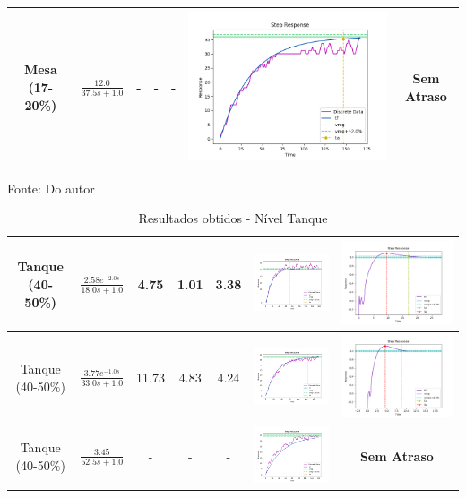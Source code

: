 \begin{table}[!htbp]
\begin{tabular}{|c|c|c|c|c|c|c|}
\hline
Mesa (17-20\%) & $\frac{12.0}{37.5s + 1.0}$ & - & - & - & \includegraphics[width=0.2\linewidth]{figuras/mesa_17_20} & \textbf{Sem Atraso} \\
\hline
\end{tabular}
\label{tab:results_mesa}
\vspace{0cm}\hspace{0cm}\small{Fonte: Do autor}
\end{table}

\begin{table}[!htbp]
\caption{Resultados obtidos - Nível Tanque}
\centering
\begin{tabular}{|c|c|c|c|c|c|c|}
\hline
Tanque (40-50\%) & $\frac{2.58 e^{-2.0s}}{18.0s + 1.0}$ & 4.75 & 1.01 & 3.38 & \includegraphics[width=0.2\linewidth]{figuras/tanque_40_50} & \includegraphics[width=0.2\linewidth]{figuras/tanque_40_50c} \\
\hline
Tanque (40-50\%) & $\frac{3.77 e^{-1.0s}}{33.0s + 1.0}$ & 11.73 & 4.83 & 4.24 & \includegraphics[width=0.2\linewidth]{figuras/tanque_50_60} & \includegraphics[width=0.2\linewidth]{figuras/tanque_50_60c} \\
\hline
Tanque (40-50\%) & $\frac{3.45}{52.5s + 1.0}$ & - & - & - & \includegraphics[width=0.2\linewidth]{figuras/tanque_60_70} & \textbf{Sem Atraso} \\

\end{tabular}
\end{table}
